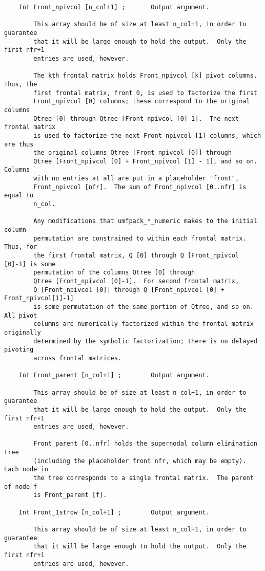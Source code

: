 {\begin{verbatim}
    Int Front_npivcol [n_col+1] ;       Output argument.

        This array should be of size at least n_col+1, in order to guarantee
        that it will be large enough to hold the output.  Only the first nfr+1
        entries are used, however.

        The kth frontal matrix holds Front_npivcol [k] pivot columns.  Thus, the
        first frontal matrix, front 0, is used to factorize the first
        Front_npivcol [0] columns; these correspond to the original columns
        Qtree [0] through Qtree [Front_npivcol [0]-1].  The next frontal matrix
        is used to factorize the next Front_npivcol [1] columns, which are thus
        the original columns Qtree [Front_npivcol [0]] through
        Qtree [Front_npivcol [0] + Front_npivcol [1] - 1], and so on.  Columns
        with no entries at all are put in a placeholder "front",
        Front_npivcol [nfr].  The sum of Front_npivcol [0..nfr] is equal to
        n_col.

        Any modifications that umfpack_*_numeric makes to the initial column
        permutation are constrained to within each frontal matrix.  Thus, for
        the first frontal matrix, Q [0] through Q [Front_npivcol [0]-1] is some
        permutation of the columns Qtree [0] through
        Qtree [Front_npivcol [0]-1].  For second frontal matrix,
        Q [Front_npivcol [0]] through Q [Front_npivcol [0] + Front_npivcol[1]-1]
        is some permutation of the same portion of Qtree, and so on.  All pivot
        columns are numerically factorized within the frontal matrix originally
        determined by the symbolic factorization; there is no delayed pivoting
        across frontal matrices.

    Int Front_parent [n_col+1] ;        Output argument.

        This array should be of size at least n_col+1, in order to guarantee
        that it will be large enough to hold the output.  Only the first nfr+1
        entries are used, however.

        Front_parent [0..nfr] holds the supernodal column elimination tree
        (including the placeholder front nfr, which may be empty).  Each node in
        the tree corresponds to a single frontal matrix.  The parent of node f
        is Front_parent [f].

    Int Front_1strow [n_col+1] ;        Output argument.

        This array should be of size at least n_col+1, in order to guarantee
        that it will be large enough to hold the output.  Only the first nfr+1
        entries are used, however.


\end{verbatim}}
